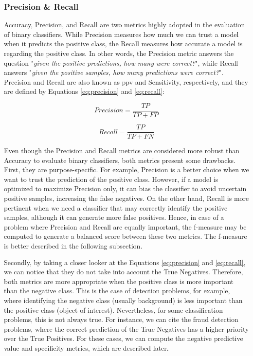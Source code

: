 \subsubsection{Precision \& Recall} \label{precision-recall}

Accuracy, Precision, and Recall are two metrics highly adopted in the evaluation of binary classifiers. While Precision measures how much we can trust a model when it predicts the positive class, the Recall measures how accurate a model is regarding the positive class. In other words, the Precision metric answers the question "\textit{given the positive predictions, how many were correct?}", while Recall answers "\textit{given the positive samples, how many predictions were correct?}". Precision and Recall are also known as \acf{ppv} and Sensitivity, respectively, and they are defined by Equations \ref{eq:precision} and \ref{eq:recall}: 

\begin{equation}
\label{eq:precision}
Precision = \frac{TP}{TP + FP}
\end{equation}

\begin{equation}
\label{eq:recall}
Recall = \frac{TP}{TP + FN}
\end{equation}

Even though the Precision and Recall metrics are considered more robust than Accuracy to evaluate binary classifiers, both metrics present some drawbacks. First, they are purpose-specific. For example, Precision is a better choice when we want to trust the prediction of the positive class. However, if a model is optimized to maximize Precision only, it can bias the classifier to avoid uncertain positive samples, increasing the false negatives. On the other hand, Recall is more pertinent when we need a classifier that may correctly identify the positive samples, although it can generate more false positives. Hence, in case of a problem where Precision and Recall are equally important, the f-measure may be computed to generate a balanced score between these two metrics. The f-measure is better described in the following subsection.

Secondly, by taking a closer looker at the Equations \ref{eq:precision} and \ref{eq:recall}, we can notice that they do not take into account the True Negatives. Therefore, both metrics are more appropriate when the positive class is more important than the negative class. This is the case of detection problems, for example, where identifying the negative class (usually background) is less important than the positive class (object of interest). Nevertheless, for some classification problems, this is not always true. For instance, we can cite the fraud detection problems, where the correct prediction of the True Negatives has a higher priority over the True Positives. For these cases, we can compute the negative predictive value and specificity metrics, which are described later.

